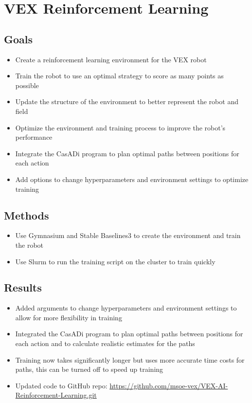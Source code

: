 \section{VEX Reinforcement Learning}

\subsection{Goals}
\begin{itemize}
    \item Create a reinforcement learning environment for the VEX robot
    \item Train the robot to use an optimal strategy to score as many points as possible
    \item Update the structure of the environment to better represent the robot and field
    \item Optimize the environment and training process to improve the robot's performance
    \item Integrate the CasADi program to plan optimal paths between positions for each action
    \item Add options to change hyperparameters and environment settings to optimize training
\end{itemize}

\subsection{Methods}
\begin{itemize}
    \item Use Gymnasium and Stable Baselines3 to create the environment and train the robot
    \item Use Slurm to run the training script on the cluster to train quickly
\end{itemize}

\subsection{Results}
\begin{itemize}
    \item Added arguments to change hyperparameters and environment settings to allow for more flexibility in training
    \item Integrated the CasADi program to plan optimal paths between positions for each action and to calculate realistic estimates for the paths
    \item Training now takes significantly longer but uses more accurate time costs for paths, this can be turned off to speed up training
    \item Updated code to GitHub repo: \href{https://github.com/msoe-vex/VEX-AI-Reinforcement-Learning.git}{https://github.com/msoe-vex/VEX-AI-Reinforcement-Learning.git}
\end{itemize}

